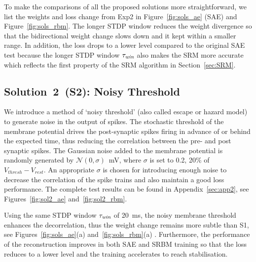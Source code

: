 To make the comparisons of all the proposed solutions more straightforward, we list the weights and loss change from Exp2 in Figure~\ref{fig:sols_ae} (SAE) and Figure~\ref{fig:sols_rbm}.
The longer STDP window reduces the weight divergence so that the bidirectional weight change slows down and it kept within a smaller range.
In addition, the loss drops to a lower level compared to the original SAE test because the longer STDP window $\tau_{\textit{\textrm{win}}}$ also makes the SRM more accurate which reflects the first property of the SRM algorithm in Section~\ref{sec:SRM}.



\subsection{Solution~2~(S2): Noisy Threshold}
We introduce a method of `noisy threshold' (also called escape or hazard model)~\citep{gerstner2002spiking} to generate noise in the output of spikes.
The stochastic threshold of the membrane potential drives the post-synaptic spikes firing in advance of or behind the expected time, thus reducing the correlation between the pre- and post synaptic spikes.
The Gaussian noise added to the membrane potential is randomly generated by $\mathcal{N}(0, \sigma)$~mV, where $\sigma$ is set to 0.2, 20\% of $V_{thresh} - V_{rest}.$
An appropriate $\sigma$ is chosen for introducing enough noise to decrease the correlation of the spike trains and also maintain a good loss performance.
The complete test results can be found in Appendix~\ref{sec:app2}, see Figures~\ref{fig:sol2_ae} and~\ref{fig:sol2_rbm}.

Using the same STDP window $\tau_{\textit{\textrm{win}}}$ of 20~ms, the noisy membrane threshold enhances the decorrelation, thus the weight change remains more subtle than S1, see Figures~\ref{fig:sols_ae}(a) and~\ref{fig:sols_rbm}(a) .
Furthermore, the performance of the reconstruction improves in both SAE and SRBM training so that the loss reduces to a lower level and the training accelerates to reach stabilisation. %


